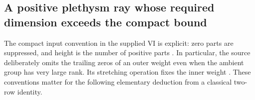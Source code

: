 \subsection{A positive plethysm ray whose required dimension exceeds the compact bound}
The compact input convention in the supplied VI is explicit: zero parts
are suppressed, and height is the number of positive parts
\cite[\S1.1, p.~9; opening of \S3.4, p.~53]{VI}.
In particular, the source deliberately omits the trailing zeros of an
outer weight even when the ambient group has very large rank.
Its stretching operation fixes the inner weight
\cite[equation~(1.5), p.~20]{VI}.
These conventions matter for the following elementary deduction from a
classical two-row identity.

